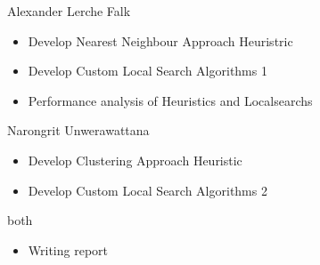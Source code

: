 \documentclass[12pt]{article}
\begin{document}
Alexander Lerche Falk
\begin{itemize}
	\item Develop Nearest Neighbour Approach Heuristric \item Develop Custom Local Search Algorithms 1
	\item Performance analysis of Heuristics and Localsearchs
\end{itemize}
Narongrit Unwerawattana
\begin{itemize}
	\item Develop Clustering Approach Heuristic
	\item Develop Custom Local Search Algorithms 2
\end{itemize}
both
\begin{itemize}
	\item Writing report
\end{itemize}


\newpage


\end{document}
